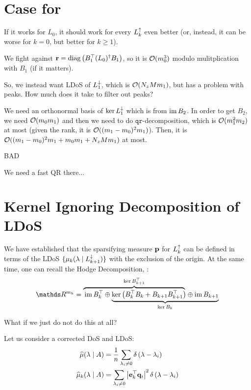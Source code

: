 \documentclass{mynotes}
\begin{document}
\chapter{ Case for \( \textcolor{white}{L_0} \) }

If it works for \( L_0 \), it should work for every \( L_{k}^{\uparrow} \) even better (or, instead, it can be worse for \( k = 0 \), but better for \( k \ge 1 \)).

We fight against \( \mathbf{r} = \operatorname{diag} \left(  B_1^\top (L_0)^\dagger B_1 \right)\), so it is \( \mathcal{O} (m_0^3 )\) modulo mulitplication with \( B_1 \) (if it matters).

So, we instead want LDoS of \( L_{1}^{\downarrow} \), which is \( \mathcal{O} (N_z M m_1 )\), but has a problem with peaks. How much does it take to filter out peaks?

We need an orthonormal basis of \( \ker L_{1}^{\downarrow} \) which is from \( \operatorname{im} B_2 \). In order to get \( B_2 \), we need \( \mathcal{O}( m_0 m_1 )\) and then we need to do \( \texttt{qr}\)-decomposition, which is \( \mathcal{O} (  m_1^2 m_2 ) \) at most (given the rank, it is \( \mathcal{O} ( (m_1 - m_0)^2 m_1 )\)). Then, it is \( \mathcal{O} ( (m_1 - m_0)^2 m_1  + m_0 m_1 + N_z M m_1 ) \) at most. 

BAD

We need a fast QR there...



\chapter{ Kernel Ignoring Decomposition of LDoS }

We have established that the sparsifying measure \( \mathbf{p} \) for \( L_{k}^{\uparrow} \) can be defined in terms of the LDoS \( \{ \mu_k (\lambda \mid L_{k+1}^{\downarrow})  \} \) with the exclusion of the origin. At the same time, one can recall the Hodge Decomposition, \cite{Lim15}:
\begin{equation}
      \ds R^{m_k} = \lefteqn{\overbrace{\phantom{\im B_k^\top \oplus  \ker \left( B_k^\top B_k + B_{k+1} B_{k+1}^\top \right)}}^{\ker B_{k+1}^\top}} \im B_k^\top \oplus
      \underbrace{\ker \left( B_k^\top B_k + B_{k+1} B_{k+1}^\top \right) \oplus  \im B_{k+1}}_{\ker B_k}            
\end{equation}




What if we just do not do this at all?

\begin{definition}
      Let us consider a corrected DoS and LDoS:
      \begin{equation}
            \begin{aligned}
                  \widehat{\mu}( \lambda \mid A ) & = \frac{1}{n} \sum_{ \lambda_i \ne 0 } \delta \left( \lambda - \lambda_i \right) \\
                  \widehat{\mu}_k ( \lambda \mid A ) & = \sum_{ \lambda_i \ne 0 } \left| \mathbf{e}_k^\top \mathbf{q}_i \right|^2 \delta \left( \lambda - \lambda_i \right)
            \end{aligned}
      \end{equation} 
\end{definition}
\end{document}
